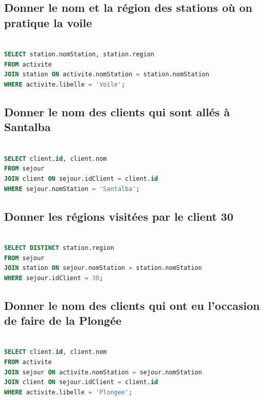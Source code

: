 \documentclass{article}
\begin{document}
\subsection{Donner le nom et la région des stations où on pratique la voile}

\begin{lstlisting}[language=SQL]

SELECT station.nomStation, station.region 
FROM activite 
JOIN station ON activite.nomStation = station.nomStation 
WHERE activite.libelle = 'Voile';

\end{lstlisting}

\subsection{Donner le nom des clients qui sont allés à Santalba}

\begin{lstlisting}[language=SQL]

SELECT client.id, client.nom
FROM sejour
JOIN client ON sejour.idClient = client.id
WHERE sejour.nomStation = 'Santalba';

\end{lstlisting}

\subsection{Donner les régions visitées par le client 30}

\begin{lstlisting}[language=SQL]

SELECT DISTINCT station.region
FROM sejour
JOIN station ON sejour.nomStation = station.nomStation
WHERE sejour.idClient = 30;

\end{lstlisting}

\subsection{Donner le nom des clients qui ont eu l’occasion de faire de la Plongée}

\begin{lstlisting}[language=SQL]

SELECT client.id, client.nom
FROM activite
JOIN sejour ON activite.nomStation = sejour.nomStation
JOIN client ON sejour.idClient = client.id
WHERE activite.libelle = 'Plongee';

\end{lstlisting}
\end{document}
